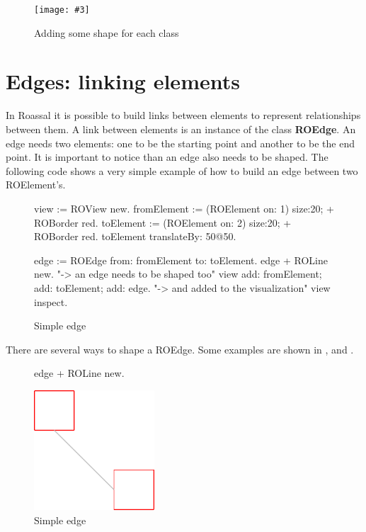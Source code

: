 \documentclass[a4paper,10pt,twoside]{book}
\newcommand{\fig}[4]{
		\begin{figure}[#1]
			\centering
			\texttt{[image: \#3]}
			\caption{\label{fig:#3}#4}
		\end{figure}}
\begin{document}
\fig{H}{0.6}{hier2}{Adding some shape for each class}


\section{Edges: linking elements} 

In Roassal it is possible to build links between elements to represent relationships between them. A link between elements is an instance of the class \textbf{ROEdge}. An edge needs two elements: one to be the starting point and another to be the end point. It is important to notice than an edge also needs to be shaped. The following code shows a very simple example of how to build an edge between two ROElement's.


\begin{figure}[H]
 \begin{code}{}
view := ROView new.
fromElement := (ROElement on: 1) size:20; + ROBorder red.
toElement := (ROElement on: 2)  size:20; + ROBorder red.
toElement translateBy: 50@50.

edge := ROEdge from: fromElement to: toElement.
edge + ROLine new. "-> an edge needs to be shaped too"
view 
	add: fromElement; 
	add: toElement; 
	add: edge. "-> and added to the visualization"
view inspect.
\end{code}   
\caption{Simple edge}
\label{fig:simpleEdge}
\end{figure} 

There are several ways to shape a ROEdge. Some examples are shown in ,  and .

\begin{figure}[H]
      \begin{minipage}[t]{0.5\textwidth}
      \vspace{0pt}
     \begin{code}{}
edge + ROLine new. \end{code}
   \end{minipage}
   \hfill
   \begin{minipage}[t]{0.4\textwidth}
      \vspace{0pt} \raggedright
       \centering
		\includegraphics[width=0.4\textwidth]{line}
   \end{minipage}
\caption{Simple edge}
\label{fig:line}
\end{figure} 
\end{document}
